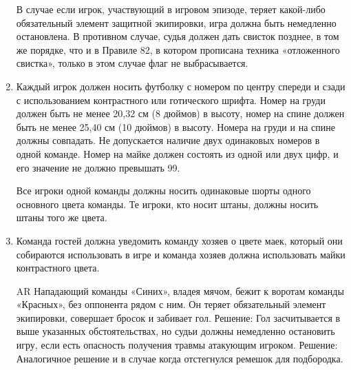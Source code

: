 \documentclass[../main.tex]{subfiles}
\begin{document}
\begin{enumerate}
  В случае если игрок, участвующий в игровом эпизоде, теряет какой-либо обязательный элемент защитной экипировки, игра должна быть немедленно остановлена. В противном случае, судья должен дать свисток позднее, в том же порядке, что и в Правиле 82, в котором прописана техника «отложенного свистка», только в этом случае флаг не выбрасывается.

  \item Каждый игрок должен носить футболку с номером по центру спереди и сзади с использованием контрастного или готического шрифта. Номер на груди должен быть не менее 20,32 см (8 дюймов) в высоту, номер на спине должен быть не менее 25,40 см (10 дюймов) в высоту.\newline
  Номера на груди и на спине должны совпадать. Не допускается наличие двух одинаковых номеров в одной команде. Номер на майке должен состоять из одной или двух цифр, и его значение не должно превышать 99.

  Все игроки одной команды должны носить одинаковые шорты одного основного цвета команды. Те игроки, кто носит штаны, должны носить штаны того же цвета.

  \item Команда гостей должна уведомить команду хозяев о цвете маек, который они собираются использовать в игре и команда хозяев должна использовать майки контрастного цвета.
  
  AR Нападающий команды «Синих», владея мячом, бежит к воротам команды «Красных», без оппонента рядом с ним.\newline
  Он теряет обязательный элемент экипировки, совершает бросок и забивает гол.
  Решение: Гол засчитывается в выше указанных обстоятельствах, но судьи должны немедленно остановить игру, если есть опасность получения травмы атакующим игроком.
  Решение: Аналогичное решение и в случае когда отстегнулся ремешок для подбородка.
\end{enumerate}
\end{document}
